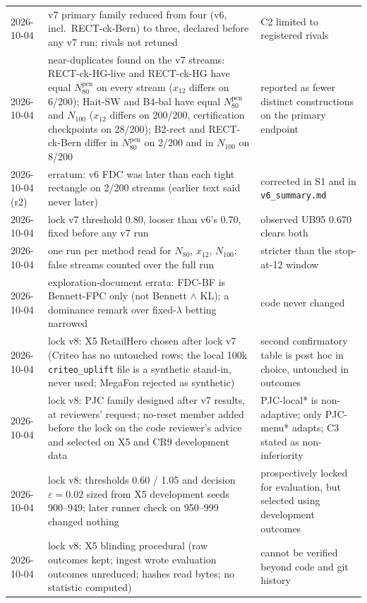 \documentclass[sigconf,anonymous,review]{acmart}
\newcommand{\eps}{\varepsilon}
\newcommand{\Npen}{N_{80}^{\text{pen}}}
\begin{document}
\begin{table}[t]
\begin{tabular}{@{}l>{\raggedright\arraybackslash}p{6.6cm}>{\raggedright\arraybackslash}p{7.6cm}@{}}
2026-10-04 & v7 primary family reduced from four (v6, incl.\ RECT-ck-Bern) to three, declared before any v7 run; rivals not retuned & C2 limited to registered rivals \\
2026-10-04 & near-duplicates found on the v7 streams: RECT-ck-HG-live and RECT-ck-HG have equal $\Npen$ on every stream ($x_{12}$ differs on 6/200); Hait-SW and B4-bal have equal $\Npen$ and $N_{100}$ ($x_{12}$ differs on 200/200, certification checkpoints on 28/200); B2-rect and RECT-ck-Bern differ in $\Npen$ on 2/200 and in $N_{100}$ on 8/200 & reported as fewer distinct constructions on the primary endpoint \\
2026-10-04 (r2) & erratum: v6 FDC was later than each tight rectangle on 2/200 streams (earlier text said never later) & corrected in S1 and in \texttt{v6\_summary.md} \\
2026-10-04 & lock v7 threshold 0.80, looser than v6's 0.70, fixed before any v7 run & observed UB95 0.670 clears both \\
2026-10-04 & one run per method read for $N_{80}$, $x_{12}$, $N_{100}$; false streams counted over the full run & stricter than the stop-at-12 window \\
2026-10-04 & exploration-document errata: FDC-BF is Bennett-FPC only (not Bennett $\wedge$ KL); a dominance remark over fixed-$\lambda$ betting narrowed & code never changed \\
2026-10-04 & lock v8: X5 RetailHero chosen after lock v7 (Criteo has no untouched rows; the local 100k \texttt{criteo\_uplift} file is a synthetic stand-in, never used; MegaFon rejected as synthetic) & second confirmatory table is post hoc in choice, untouched in outcomes \\
2026-10-04 & lock v8: PJC family designed after v7 results, at reviewers' request; no-reset member added before the lock on the code reviewer's advice and selected on X5 and CR9 development data & PJC-local* is non-adaptive; only PJC-menu* adapts; C3 stated as non-inferiority \\
2026-10-04 & lock v8: thresholds 0.60 / 1.05 and decision $\eps = 0.02$ sized from X5 development seeds 900--949; later runner check on 950--999 changed nothing & prospectively locked for evaluation, but selected using development outcomes \\
2026-10-04 & lock v8: X5 blinding procedural (raw outcomes kept; ingest wrote evaluation outcomes unreduced; hashes read bytes; no statistic computed) & cannot be verified beyond code and git history \\

\end{tabular}
\end{table}
\end{document}
